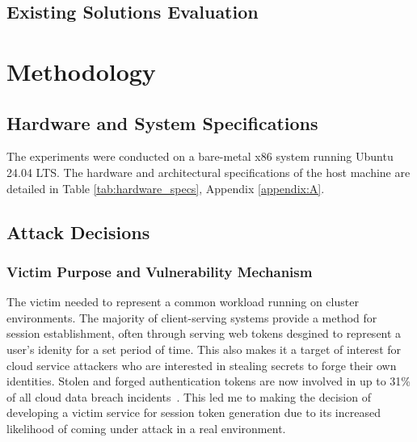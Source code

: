 \documentclass[11pt,a4paper, notitlepage]{article}
\begin{document}
\subsection{Existing Solutions Evaluation}
\begin{table}[!htbp]
\centering
\label{tab:existing_solutions}
\caption{\small{Comparison of existing cache side channel detection solutions and scope}}
\end{table}
\vspace{-0.5cm}

\section{Methodology}
\subsection{Hardware and System Specifications}
The experiments were conducted on a bare-metal x86 system running Ubuntu 24.04 LTS. The hardware and architectural specifications of the host machine are detailed in Table \ref{tab:hardware_specs}, Appendix \ref{appendix:A}.


\subsection{Attack Decisions}
\subsubsection{Victim Purpose and Vulnerability Mechanism}
The victim needed to represent a common workload running on cluster environments. The majority of client-serving systems provide a method for session 
establishment, often through serving web tokens desgined to represent a user's idenity for a set period of time. This also makes it a target of interest
for cloud service attackers who are interested in stealing secrets to forge their own identities. Stolen and forged 
authentication tokens are now involved in up to 31\% of all cloud data breach incidents~\cite{verizon}. This led me to making the decision of developing
a victim service for session token generation due to its increased likelihood of coming under attack in a real environment.
\end{document}
